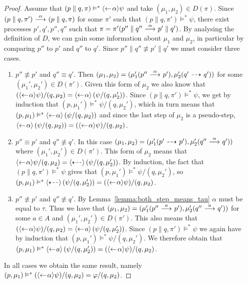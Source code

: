 \begin{proof}
    \par\nobreak
    \ltr Assume that $(p\parallel q, \pi) \vDash^* \mbox{\ensuremath{\langle\leftarrow\! \alpha \rangle}}\psi$ and take
    $(\mu_1,\mu_2)\in D(\pi)$. Since \mbox{$(p\parallel q, \pi') \ {\stackrel{{\alpha}}{\longrightarrow}}\  (p\parallel
    q, \pi)$} for some $\pi'$ such that $(p\parallel q,\pi') \vDash^* \psi$,
    there exist processes $p',q',p'',q''$ such that $\pi
    = \pi'(p''\parallel q'' \ {\stackrel{{\alpha}}{\longrightarrow}}\  p'\parallel q')$. By analysing the definition
    of $D$, we can gain some information about $\mu_1$ and $\mu_2$, in particular by
    comparing $p''$ to $p'$ and $q''$ to $q'$. Since $p''\parallel q'' \not\equiv
    p'\parallel q'$ we must consider three cases.
    \begin{enumerate}
        \item $p''\not\equiv p'$ and $q''\equiv q'$. Then $(\mu_1,\mu_2) = (\mu_1'
            (p'' \ {\stackrel{{\alpha}}{\longrightarrow}}\  p'), \mu_2'(q' \ {\stackrel{_{}}{\dashrightarrow}}\  q'))$ for some $(\mu_1',\mu_2')
            \in D(\pi')$. Given this form of $\mu_2$ we also know that $(\mbox{\ensuremath{\langle\leftarrow\! \alpha \rangle}}
            \psi) / (q,\mu_2) = \mbox{\ensuremath{\langle\leftarrow\! \alpha \rangle}} \left( \psi / (q,\mu_2') \right)$. Since
            $(p\parallel q, \pi') \vDash^* \psi$, we get by induction that $(p,\mu_1')
            \vDash^* \psi / (q,\mu_2')$, which in turn means that $(p,\mu_1)\vDash^*
            \mbox{\ensuremath{\langle\leftarrow\! \alpha \rangle}} \left(\psi / (q,\mu_2)\right)$ and since the last step of
            $\mu_2$ is a pseudo-step, $\mbox{\ensuremath{\langle\leftarrow\! \alpha \rangle}} \left(\psi / (q,\mu_2)\right)
            = (\mbox{\ensuremath{\langle\leftarrow\! \alpha \rangle}}\psi)/(q,\mu_2)$.
        \item $p''\equiv p'$ and $q''\not\equiv q'$. In this case $(\mu_1,\mu_2)
            = (\mu_1'(p'\ {\stackrel{_{}}{\dashrightarrow}}\ p'), \mu_2'(q''\ {\stackrel{{\alpha}}{\longrightarrow}}\ q'))$ where $(\mu_1',
            \mu_2') \in D(\pi')$. This form of $\mu_2$ means that $\mbox{\ensuremath{\langle\leftarrow\! \alpha \rangle}}
            \psi / (q,\mu_2) = \mbox{\ensuremath{\langle\stackrel{_{}}{\dashleftarrow}\rangle}} \left( \psi / (q,\mu_2') \right)$.
            By induction, the fact that $(p\parallel q, \pi') \vDash^* \psi$ gives
            that $(p,\mu_1') \vDash^* \psi / (q,\mu_2')$, so $(p,\mu_1) \vDash^*
            \mbox{\ensuremath{\langle\stackrel{_{}}{\dashleftarrow}\rangle}} \left( \psi / (q,\mu_2') \right) = (\mbox{\ensuremath{\langle\leftarrow\! \alpha \rangle}}\psi)
            / (q,\mu_2)$.
        \item $p''\not\equiv p'$ and $q''\not\equiv q'$. By Lemma~\ref{lemma:both_step_means_tau}
            $\alpha$ must be equal to $\tau$. Thus we have that $(\mu_1,\mu_2) =
            (\mu_1'(p''\ {\stackrel{{a}}{\longrightarrow}}\ p'), \mu_2'(q''\ {\stackrel{{a}}{\longrightarrow}}\ q'))$ for some $a\in A$ and
            $(\mu_1',\mu_2') \in D(\pi')$. This also means that $(\mbox{\ensuremath{\langle\leftarrow\! \alpha \rangle}}\psi)
            / (q,\mu_2) = \mbox{\ensuremath{\langle\leftarrow\! a \rangle}}\left( \psi / (q,\mu_2') \right)$. Since $(p\parallel q,
            \pi') \vDash^* \psi$ we again have by induction that $(p,\mu_1')\vDash^*\psi/(q,
            \mu_2')$. We therefore obtain that $(p,\mu_1) \vDash^* \mbox{\ensuremath{\langle\leftarrow\! a \rangle}}\left(
            \psi / (q,\mu_2') \right) = (\mbox{\ensuremath{\langle\leftarrow\! \alpha \rangle}}\psi) / (q,\mu_2)$.
    \end{enumerate}
    In all cases we obtain the same result, namely $(p,\mu_1) \vDash^* (\mbox{\ensuremath{\langle\leftarrow\! \alpha \rangle}}\psi)
    / (q,\mu_2) = \varphi/(q,\mu_2)$.


\end{proof}
